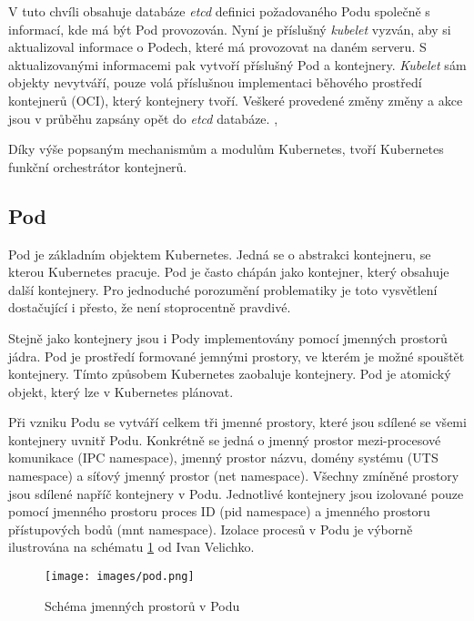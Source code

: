 V tuto chvíli obsahuje databáze \textit{etcd} definici požadovaného Podu společně s informací, kde má být Pod provozován. Nyní je příslušný \textit{kubelet} vyzván, aby si aktualizoval informace o Podech, které má provozovat na daném serveru. S aktualizovanými informacemi pak vytvoří příslušný Pod a kontejnery. \textit{Kubelet} sám objekty nevytváří, pouze volá příslušnou implementaci běhového prostředí kontejnerů (OCI), který kontejnery tvoří. Veškeré provedené změny změny a akce jsou v průběhu zapsány opět do \textit{etcd} databáze. \cite{nassimkebbani_2022_the}, \cite{poulton_2022_the}

\bigskip

Díky výše popsaným mechanismům a modulům Kubernetes, tvoří Kubernetes funkční orchestrátor kontejnerů.

\subsection{Pod}
Pod je základním objektem Kubernetes. Jedná se o abstrakci kontejneru, se kterou Kubernetes pracuje. Pod je často chápán jako kontejner, který obsahuje další kontejnery. Pro jednoduché porozumění problematiky je toto vysvětlení dostačující i přesto, že není stoprocentně pravdivé.

Stejně jako kontejnery jsou i Pody implementovány pomocí jmenných prostorů jádra. Pod je prostředí formované jemnými prostory, ve kterém je možné spouštět kontejnery. Tímto způsobem Kubernetes zaobaluje kontejnery. Pod je atomický objekt, který lze v Kubernetes plánovat.

Při vzniku Podu se vytváří celkem tři jmenné prostory, které jsou sdílené se všemi kontejnery uvnitř Podu. Konkrétně se jedná o jmenný prostor mezi-procesové komunikace (IPC namespace), jmenný prostor názvu, domény systému (UTS namespace) a síťový jmenný prostor (net namespace). Všechny zmíněné prostory jsou sdílené napříč kontejnery v Podu. Jednotlivé kontejnery jsou izolované pouze pomocí jmenného prostoru proces ID (pid namespace) a jmenného prostoru přístupových bodů (mnt namespace). Izolace procesů v Podu je výborně ilustrována na schématu \ref{img:podSchema} od Ivan Velichko.

\begin{figure}[ht]
\centering
\texttt{[image: images/pod.png]}
\caption[Schéma jmenných prostorů v Podu]{Schéma jmenných prostorů v Podu \cite{velichko_2021_kubernetes}}\label{img:podSchema}
\end{figure}

